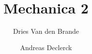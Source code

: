 \usepackage[dutch]{babel}
\usepackage{amsmath}

\title{Mechanica 2}
\author{Dries Van den Brande \and Andreas Declerck}